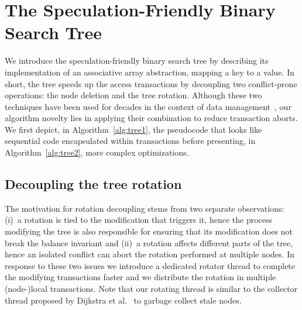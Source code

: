 

\section{The Speculation-Friendly Binary Search Tree}\label{sec:tf}

We introduce the speculation-friendly binary search tree by describing its implementation of an associative array abstraction, mapping a key to 
a value. In short, the tree speeds up the access transactions by decoupling two conflict-prone operations: the node deletion and the tree rotation. 
Although these two techniques have been used for decades in the context of data management~\cite{DLM78,Moh90}, our algorithm novelty lies in applying 
their combination to reduce transaction aborts. We first depict, in Algorithm~\ref{alg:tree1}, the pseudocode that looks like sequential code encapsulated 
within transactions before presenting, in Algorithm~\ref{alg:tree2}, more complex optimizations.

\subsection{Decoupling the tree rotation}
The motivation for rotation decoupling stems from two separate observations: (i)~a rotation is tied to the modification that triggers it, hence the process 
modifying the tree is also responsible for ensuring that its modification does not break the balance invariant and (ii)~a rotation affects different 
parts of the tree, hence an isolated conflict can abort the rotation performed at multiple nodes.
In response to these two issues we introduce a dedicated rotator thread to complete the modifying transactions faster and we distribute the rotation 
in multiple (node-)local transactions. 
Note that our rotating thread is similar to the collector 
thread proposed by Dijkstra et al.~\cite{DLM78} to garbage collect stale nodes.

